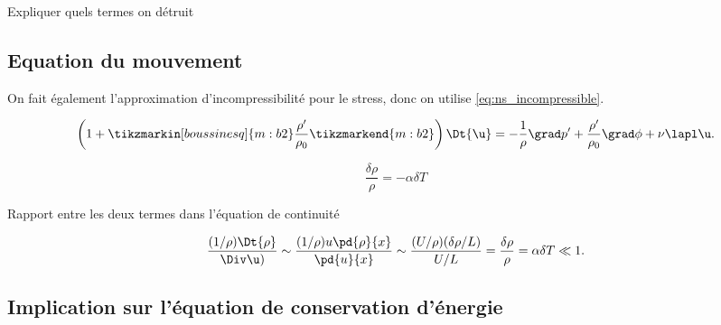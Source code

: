 Expliquer quels termes on  détruit

\subsection{Equation du mouvement}

On fait également l'approximation d'incompressibilité pour le stress, donc on utilise \eqref{eq:ns_incompressible}. 


\begin{equation}
  \left( 1 + \tikzmarkin[boussinesq]{m:b2}\frac{\rho^\prime}{\rho_0}\tikzmarkend{m:b2} \right) \Dt{\u} = -\frac{1}{\rho}\grad p^\prime + \frac{\rho^\prime}{\rho_0} \grad \phi  + \nu \lapl \u. 
  \label{eq:ns_bousinesq}
\end{equation}


\begin{displaymath}
  \frac{\delta \rho}{\rho} = - \alpha \delta T 
\end{displaymath}


Rapport entre les deux termes dans l'équation de continuité

\begin{displaymath}
  \frac{(1/\rho)\Dt{\rho}}{\Div \u)} \sim 
  \frac{(1/\rho) u \pd{\rho}{x}}{\pd{u}{x}} \sim
  \frac{(U/\rho)(\delta \rho / L )}{U/L} =
  \frac{\delta \rho}{\rho} = \alpha \delta T \ll 1. 
\end{displaymath}


\subsection{Implication sur l'équation de conservation d'énergie}


